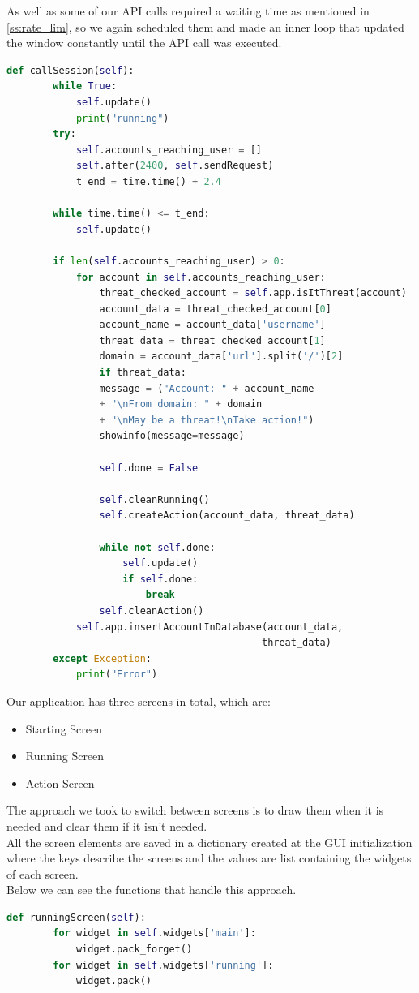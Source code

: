 As well as some of our API calls required a waiting time as mentioned in \ref{ss:rate_lim},
so we again scheduled them and made an inner loop that updated the window constantly until the API call was executed.
\\[5pt]
\begin{lstlisting}[language=python, caption={Updating the window while calling API functions}, captionpos=b]
	def callSession(self):
		while True:
			self.update()
			print("running")
		try:
			self.accounts_reaching_user = []
			self.after(2400, self.sendRequest)
			t_end = time.time() + 2.4
		
		while time.time() <= t_end:
			self.update()
		
		if len(self.accounts_reaching_user) > 0:
			for account in self.accounts_reaching_user:
				threat_checked_account = self.app.isItThreat(account)
				account_data = threat_checked_account[0]
				account_name = account_data['username']
				threat_data = threat_checked_account[1]
				domain = account_data['url'].split('/')[2]
				if threat_data:
				message = ("Account: " + account_name
				+ "\nFrom domain: " + domain 
				+ "\nMay be a threat!\nTake action!")
				showinfo(message=message)
		
				self.done = False
		
				self.cleanRunning() 
				self.createAction(account_data, threat_data)
		
				while not self.done:
					self.update()
					if self.done:
						break
				self.cleanAction()
			self.app.insertAccountInDatabase(account_data, 
											threat_data)
		except Exception:
			print("Error")
\end{lstlisting}
Our application has three screens in total, which are:
\begin{itemize}
	\item Starting Screen
	\item Running Screen
	\item Action Screen
\end{itemize}
The approach we took to switch between screens is to draw them when it is needed and
clear them if it isn't needed.
\\[5pt]
All the screen elements are saved in a dictionary created at the GUI initialization where the keys
describe the screens and the values are list containing the widgets of each screen.
\\[5pt]
Below we can see the functions that handle this approach.
\\[5pt]
\begin{lstlisting}[language=python, caption={Switching from starting screen to running screen}, captionpos=b]
	def runningScreen(self):
		for widget in self.widgets['main']:
			widget.pack_forget()
		for widget in self.widgets['running']:
			widget.pack()
\end{lstlisting}

